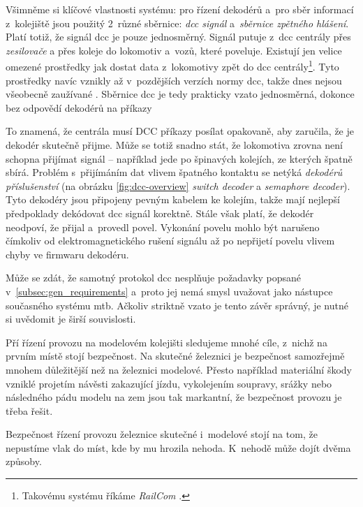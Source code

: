 Všimněme si klíčové vlastnosti systému: pro řízení dekodérů
a~pro sběr informací z~kolejiště jsou použitý 2~různé sběrnice: \textit{dcc
signál} a~\textit{sběrnice zpětného hlášení}. Platí totiž, že signál \gls{dcc}
je pouze jednosměrný. Signál putuje z~\gls{dcc} centrály přes
\textit{zesilovače} a přes koleje do lokomotiv a~vozů, které poveluje.
Existují jen velice omezené prostředky jak dostat data z~lokomotivy zpět do
\gls{dcc} centrály\footnote{Takovému systému říkáme \textit{RailCom}
\cite{railcom:web}.}. Tyto prostředky navíc vznikly až v~pozdějších verzích
normy \gls{dcc}, takže dnes nejsou všeobecně zaužívané \cite{railcom:web}.
Sběrnice \gls{dcc} je tedy prakticky vzato jednosměrná, dokonce bez odpovědí
dekodérů na příkazy

To znamená, že centrála musí DCC příkazy posílat opakovaně, aby zaručila, že je
dekodér skutečně přijme. Může se totiž snadno stát, že lokomotiva zrovna není
schopna přijímat signál – například jede po špinavých kolejích, ze kterých
špatně sbírá. Problém s~přijímáním dat vlivem špatného kontaktu se netýká
\textit{dekodérů příslušenství} (na obrázku \ref{fig:dcc-overview}
\textit{switch decoder} a \textit{semaphore decoder}).  Tyto dekodéry jsou
připojeny pevným kabelem ke kolejím, takže mají nejlepší předpoklady dekódovat
\gls{dcc} signál korektně. Stále však platí, že dekodér neodpoví, že přijal
a~provedl povel. Vykonání povelu mohlo být narušeno čímkoliv od
elektromagnetického rušení signálu až po nepřijetí povelu vlivem chyby ve
firmwaru dekodéru.

Může se zdát, že samotný protokol \gls{dcc} nesplňuje požadavky popsané
v~\ref{subsec:gen_requirements} a~proto jej nemá smysl uvažovat jako nástupce
současného systému \gls{mtb}. Ačkoliv striktně vzato je tento závěr
správný, je nutné si uvědomit je širší souvislosti.

Pří řízení provozu na modelovém kolejišti sledujeme mnohé cíle, z~nichž na
prvním místě stojí bezpečnost. Na skutečné železnici je bezpečnost samozřejmě
mnohem důležitější než na železnici modelové. Přesto například materiální škody
vzniklé projetím návěsti zakazující jízdu, vykolejením soupravy, srážky nebo
následného pádu modelu na zem jsou tak markantní, že bezpečnost provozu je
třeba řešit.

Bezpečnost řízení provozu železnice skutečné i~modelové stojí na tom, že
nepustíme vlak do míst, kde by mu hrozila nehoda. K~nehodě může dojít dvěma
způsoby.

